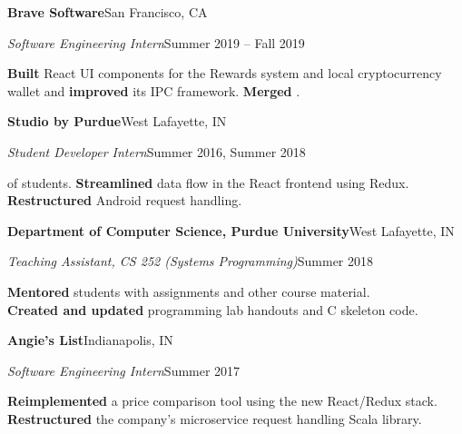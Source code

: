 \begin{minipage}[t]{0.665\textwidth}
  \vspace{5pt}
  \textbf{Brave Software}\quad{}\hfill San Francisco, CA
  \begin{adjustwidth}{10pt}{}
    \emph{Software Engineering Intern}\hfill Summer 2019 -- Fall 2019

    \textbf{Built} React UI components for the Rewards system and local cryptocurrency wallet and \textbf{improved} its IPC framework.
    \textbf{Merged} .
  \end{adjustwidth}

  \vspace{5pt}
  \textbf{Studio by Purdue}\hfill West Lafayette, IN
  \begin{adjustwidth}{10pt}{}
    \emph{Student Developer Intern}\hfill Summer 2016, Summer 2018

     of students.
    \textbf{Streamlined} data flow in the React frontend using Redux.
    \textbf{Restructured} Android request handling.
  \end{adjustwidth}

  \vspace{5pt}
  \textbf{Department of Computer Science, Purdue University}\hfill West Lafayette, IN
  \begin{adjustwidth}{10pt}{}
    \emph{Teaching Assistant, CS 252 (Systems Programming)}\hfill Summer 2018

    \textbf{Mentored} students with assignments and other course material.\\
    \textbf{Created and updated} programming lab handouts and C skeleton code.
  \end{adjustwidth}

  \vspace{5pt}
  \textbf{Angie's List}\quad{}\hfill Indianapolis, IN
  \begin{adjustwidth}{10pt}{}
    \emph{Software Engineering Intern}\hfill Summer 2017

    \textbf{Reimplemented} a price comparison tool using the new React/Redux stack.
    \textbf{Restructured} the company's microservice request handling Scala library.
  \end{adjustwidth}


\end{minipage}
